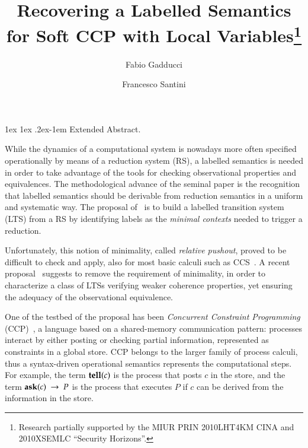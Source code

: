 \documentclass[submission,copyright,creativecommons]{eptcs}
\title{Recovering a Labelled Semantics\\ for Soft CCP with Local Variables\thanks{Research 
		partially supported 
		by the MIUR PRIN 2010LHT4KM CINA
		and 2010XSEMLC ``Security Horizons''.
	}
}
\author{Fabio Gadducci
	\institute{Dipartimento di Informatica, \\ Universit\`a di Pisa, Italy}
	\email{gadducci@di.unipi.it}
	\and
	Francesco Santini
	\institute{IIT-CNR, \\
		Pisa, Italy}
	\email{\quad francesco.santini@iit.cnr.it}
}
\makeatletter
\renewcommand{\paragraph}{%
	\@startsection{paragraph}{4}%
	{\z@}{1ex \@plus 1ex \@minus .2ex}{-1em}%
	{\normalfont\normalsize\bfseries}%
}
\makeatother
\begin{document}

\maketitle


\paragraph{Extended Abstract.}


While the dynamics of a computational system is nowadays more often
specified operationally by means of a reduction system (RS), a
labelled semantics is needed in order to take advantage of the tools
for checking observational properties and equivalences.  The
methodological advance of the seminal paper \cite{Leifer:00:CONCUR} is
the recognition that labelled semantics should be derivable from
reduction semantics in a uniform and systematic way.  The proposal
of~\cite{Leifer:00:CONCUR} is to build a labelled transition system
(LTS) from a RS by identifying labels as the \emph{minimal contexts}
needed to trigger a reduction.

Unfortunately, this notion of minimality, called \emph{relative
  pushout}, proved to be difficult to check and apply, also for most
basic calculi such as CCS~\cite{BonchiGK09, Milner06}. A
recent proposal~\cite{BonchiGM14} suggests to remove the requirement
of minimality, in order to characterize a class of LTSs verifying
weaker coherence properties, yet ensuring the adequacy of the
observational equivalence.  

One of the testbed of the proposal has been
\emph{Concurrent Constraint Programming} (CCP)~\cite{popl91}, a
language based on a shared-memory communication pattern: processes
interact by either posting or checking partial information,
represented as constraints in a global store.
%
CCP belongs to the larger family of process calculi, thus a syntax-driven operational semantics 
represents the computational steps. For example, the term ${\bf tell}(c)$ is the process that posts $c$ in the store, 
and the term ${\bf ask}(c) \ \rightarrow \ P$ is the process that executes $P$ if $c$ can be derived from the information 
in the store. 
\end{document}
